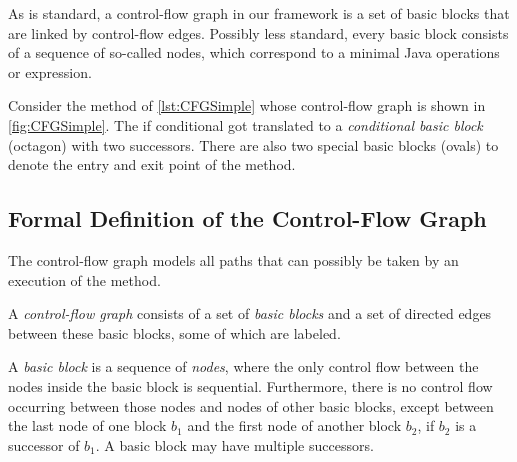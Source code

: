 As is standard, a control-flow graph in our framework is a set of basic blocks
that are linked by control-flow edges. Possibly less standard,
every basic block consists of a sequence
of so-called nodes, which correspond to a minimal Java operations or expression.



Consider the method  of \autoref{lst:CFGSimple} whose control-flow
graph is shown in \autoref{fig:CFGSimple}. The if conditional got translated to
a \emph{conditional basic block} (octagon) with two successors. There are also two
special basic blocks (ovals) to denote the entry and exit point of the method.


\subsection{Formal Definition of the Control-Flow Graph}
\label{sec:cfg-formal}

The control-flow graph models all paths that can possibly be taken by an
execution of the method.

\begin{definition}
    A \emph{control-flow graph} consists of a set of \emph{basic blocks} and
    a set of directed edges between these basic blocks, some of which are labeled.
\end{definition}

\begin{definition}
    A \emph{basic block} is a sequence of \emph{nodes}, where the only
    control flow between the nodes inside
    the basic block is sequential.  Furthermore, there is no
    control flow occurring between those nodes and nodes of other basic
    blocks, except between the last node of one block $b_1$ and the first node
    of another block $b_2$, if $b_2$ is a successor of $b_1$.  A basic
    block may have multiple successors.
\end{definition}



